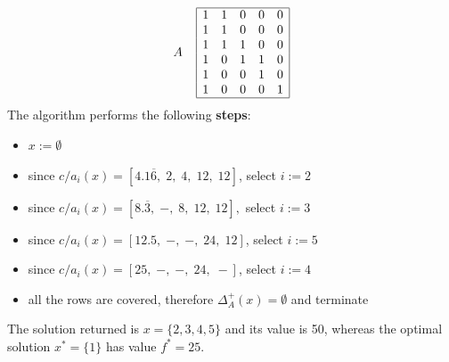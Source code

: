 $$
A \;\;\;\;
\begin{array}{| c c c c c |}
	\hline
	1 & 1 & 0 & 0 & 0 \\
	1 & 1 & 0 & 0 & 0 \\
	1 & 1 & 1 & 0 & 0 \\
	1 & 0 & 1 & 1 & 0 \\
	1 & 0 & 0 & 1 & 0 \\
	1 & 0 & 0 & 0 & 1 \\
	\hline
\end{array}
$$
The algorithm performs the following \textbf{steps}:
\begin{itemize}
	\item $x := \emptyset$
	\item since $c/a_i (x) = [4.1\overline{6}, \; 2, \; 4, \; 12, \; 12 ]$, select $i := 2$
	\item since $c/a_i (x) = [8.\overline{3}, \; -, \; 8, \; 12, \; 12 ],$ select $i := 3$
	\item since $c/a_i (x) = [12.5, \; -, \; -, \; 24, \; 12 ]$, select $i := 5$
	\item since $c/a_i (x) = [25, \; -, \; -, \; 24, \; - ]$, select $i := 4$
	\item all the rows are covered, therefore $\Delta_A^+ (x) = \emptyset$ and terminate
\end{itemize}
The solution returned is $x = \{2, 3, 4, 5\}$ and its value is 50, whereas the optimal solution $x^\ast = \{1\}$ has value $f^\ast = 25$.\\

\newpage

